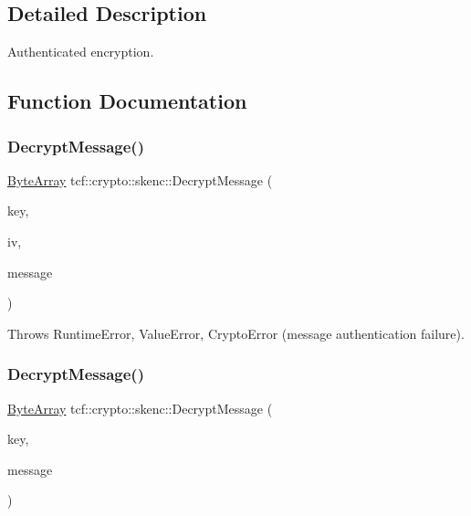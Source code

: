 \subsection{Detailed Description}
Authenticated encryption. 

\subsection{Function Documentation}
\mbox{\label{namespacetcf_1_1crypto_1_1skenc_a8720d05eba1eda7246905c6a68f0996c}} 
\subsubsection{\texorpdfstring{Decrypt\+Message()}{DecryptMessage()}\hspace{0.1cm}{\footnotesize\ttfamily [1/2]}}
{\footnotesize\ttfamily \hyperlink{types_8h_a35da937e2331acce98d47f44892f4a76}{Byte\+Array} tcf\+::crypto\+::skenc\+::\+Decrypt\+Message (\begin{DoxyParamCaption}\item[{const \hyperlink{types_8h_a35da937e2331acce98d47f44892f4a76}{Byte\+Array} \&}]{key,  }\item[{const \hyperlink{types_8h_a35da937e2331acce98d47f44892f4a76}{Byte\+Array} \&}]{iv,  }\item[{const \hyperlink{types_8h_a35da937e2331acce98d47f44892f4a76}{Byte\+Array} \&}]{message }\end{DoxyParamCaption})}

Throws Runtime\+Error, Value\+Error, Crypto\+Error (message authentication failure). \mbox{\label{namespacetcf_1_1crypto_1_1skenc_a6a9b2c3b9b5d1f2d140bcac790132739}} 
\subsubsection{\texorpdfstring{Decrypt\+Message()}{DecryptMessage()}\hspace{0.1cm}{\footnotesize\ttfamily [2/2]}}
{\footnotesize\ttfamily \hyperlink{types_8h_a35da937e2331acce98d47f44892f4a76}{Byte\+Array} tcf\+::crypto\+::skenc\+::\+Decrypt\+Message (\begin{DoxyParamCaption}\item[{const \hyperlink{types_8h_a35da937e2331acce98d47f44892f4a76}{Byte\+Array} \&}]{key,  }\item[{const \hyperlink{types_8h_a35da937e2331acce98d47f44892f4a76}{Byte\+Array} \&}]{message }\end{DoxyParamCaption})}

